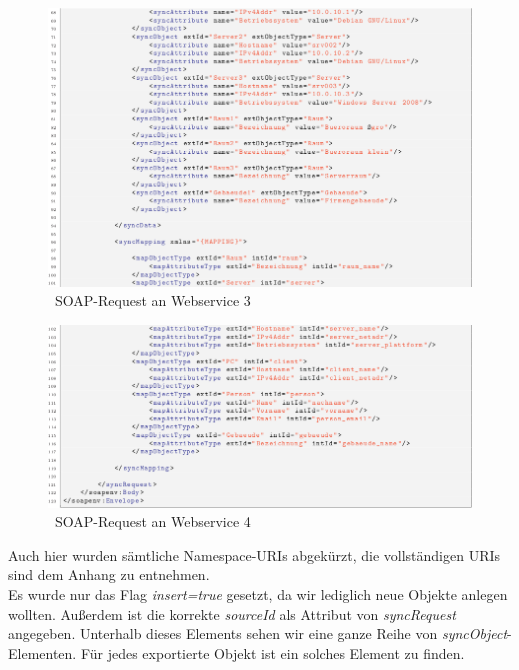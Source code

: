 \documentclass[a4paper,10pt]{book}
\begin{document}
\newline
\begin{figure}[htb!]
  \centering
  \includegraphics[scale=.55]{Screenshot/SyncAPI_Fallstudie_07.png}
  \caption{\label{SOAP-Request an Webservice 3} \ SOAP-Request an Webservice 3}
\end{figure}
\newline
\begin{figure}[htb!]
  \centering
  \includegraphics[scale=.55]{Screenshot/SyncAPI_Fallstudie_06.png}
  \caption{\label{SOAP-Request an Webservice 4} \ SOAP-Request an Webservice 4}
\end{figure}
\newline
Auch hier wurden sämtliche Namespace-URIs abgekürzt, die vollständigen URIs sind dem Anhang zu
entnehmen.
\newline\\
Es wurde nur das Flag \textit{insert=true} gesetzt, da wir lediglich neue Objekte anlegen wollten. Außerdem ist die korrekte
\textit{sourceId} als Attribut von \textit{syncRequest} angegeben. Unterhalb dieses Elements sehen wir eine ganze Reihe
von \textit{syncObject}-Elementen. Für jedes exportierte Objekt ist ein solches Element zu finden.
\end{document}

